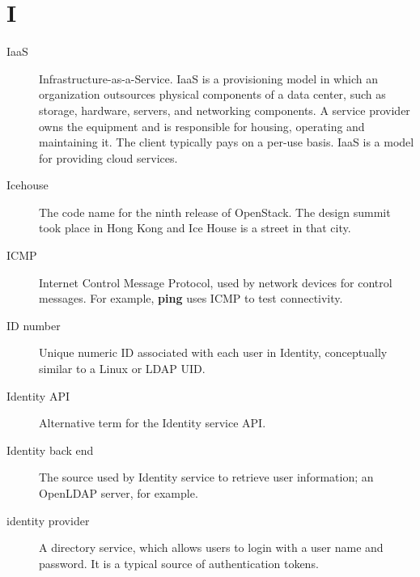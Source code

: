 \documentclass[letterpaper,10pt,english]{sphinxmanual}
\begin{document}
\section{I}
\label{_source/glossary:i}\begin{description}
\item[{IaaS}] \leavevmode{}\label{_source/glossary:term-iaas}
Infrastructure-as-a-Service. IaaS is a provisioning model in
which an organization outsources physical components of a data center,
such as storage, hardware, servers, and networking components. A
service provider owns the equipment and is responsible for housing,
operating and maintaining it. The client typically pays on a per-use
basis. IaaS is a model for providing cloud services.

\item[{Icehouse}] \leavevmode{}\label{_source/glossary:term-icehouse}
The code name for the ninth release of OpenStack. The
design summit took place in Hong Kong and Ice House is a
street in that city.

\item[{ICMP}] \leavevmode{}\label{_source/glossary:term-icmp}
Internet Control Message Protocol, used by network
devices for control messages. For example,
\textbf{ping} uses ICMP to test
connectivity.

\item[{ID number}] \leavevmode{}\label{_source/glossary:term-id-number}
Unique numeric ID associated with each user in Identity,
conceptually similar to a Linux or LDAP UID.

\item[{Identity API}] \leavevmode{}\label{_source/glossary:term-identity-api}
Alternative term for the Identity service API.

\item[{Identity back end}] \leavevmode{}\label{_source/glossary:term-identity-back-end}
The source used by Identity service to retrieve user
information; an OpenLDAP server, for example.

\item[{identity provider}] \leavevmode{}\label{_source/glossary:term-identity-provider}
A directory service, which allows users to login with a user
name and password. It is a typical source of authentication
tokens.


\end{description}
\end{document}

